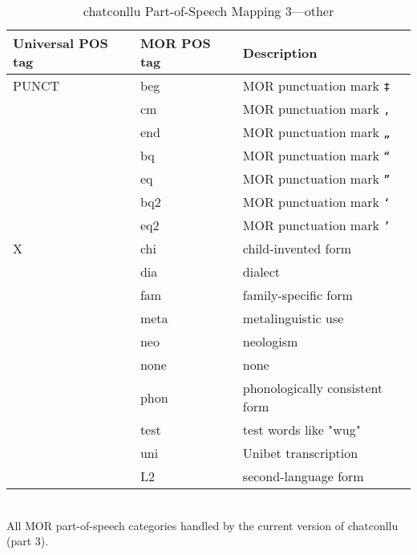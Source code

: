 \begin{table}[htp!]
\caption {chatconllu Part-of-Speech Mapping 3---other} \label{tab:posmap3}
\centering
\begin{tabularx}{\linewidth}{@{}llX@{}}
\toprule
\textbf{Universal POS tag} & \textbf{MOR POS tag} & \textbf{Description}\\ \midrule
PUNCT & beg & MOR punctuation mark \texttt{‡}\\
 & cm & MOR punctuation mark \texttt{,}\\
 & end & MOR punctuation mark \texttt{„}\\
 & bq & MOR punctuation mark \texttt{“}\\
 & eq & MOR punctuation mark \texttt{”}\\
 & bq2 & MOR punctuation mark \texttt{‘}\\
 & eq2 & MOR punctuation mark \texttt{’}\\\addlinespace
X & chi & child-invented form\\
 & dia & dialect\\
 & fam & family-specific form\\
 & meta & metalinguistic use\\
 & neo & neologism\\
 & none & none\\
 & phon & phonologically consistent form\\
 & test & test words like "wug"\\
 & uni & Unibet transcription\\
 & L2 & second-language form\\
\bottomrule
\end{tabularx}\\
\vspace{0.5cm}
All MOR part-of-speech categories handled by the current version of chatconllu (part 3).\\
\end{table}

\newpage

